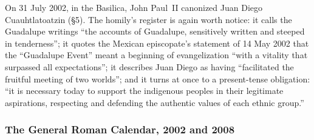 On 31 July 2002, in the Basilica, John Paul~II canonized Juan Diego
Cuauhtlatoatzin (\S5). The homily's register is again worth notice: it
calls the Guadalupe writings ``the accounts of Guadalupe, sensitively
written and steeped in tenderness''; it quotes the Mexican episcopate's
statement of 14 May 2002 that the ``Guadalupe Event'' meant a
beginning of evangelization ``with a vitality that surpassed all
expectations''; it describes Juan Diego as having ``facilitated the
fruitful meeting of two worlds''; and it turns at once to a
present-tense obligation: ``it is necessary today to support the
indigenous peoples in their legitimate aspirations, respecting and
defending the authentic values of each ethnic
group.''

\subsubsection*{The General Roman Calendar, 2002 and 2008}

